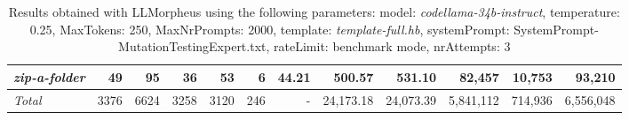 \begin{table*}
{\begin{tabular}{l||r|r|r|r|r|r||r|r||r|r|r}
   \hline
   \textit{zip-a-folder} & 49 & 95 & 36 & 53 & 6 & 44.21 & 500.57 & 531.10 & 82,457 & 10,753 & 93,210 \\ 
   \hline
   \textit{Total} & 3376 & 6624 & 3258 & 3120 & 246 & - & 24,173.18  & 24,073.39 & 5,841,112 & 714,936 & 6,556,048 \\ 
 \end{tabular}
 }
 \caption{Results obtained with LLMorpheus using the following parameters: 
   model: \textit{codellama-34b-instruct}, 
   temperature: 0.25, 
   MaxTokens: 250, 
   MaxNrPrompts: 2000, 
   template: \textit{template-full.hb}, 
   systemPrompt: SystemPrompt-MutationTestingExpert.txt, 
   rateLimit: benchmark mode, 
   nrAttempts: 3  
 }
\end{table*}

